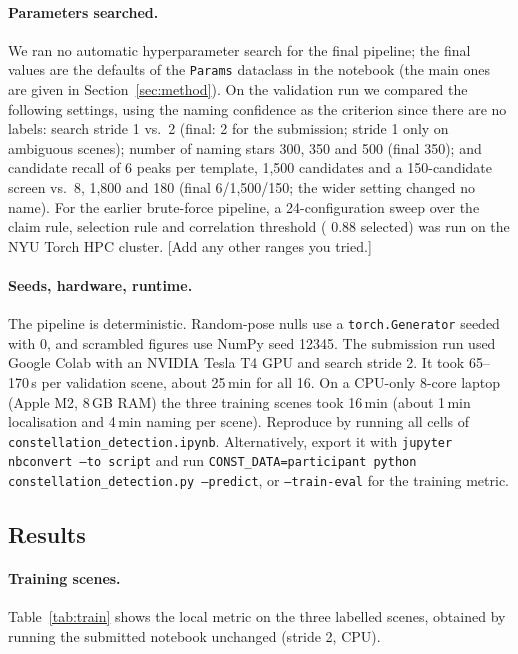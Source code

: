 \documentclass[a4paper,11pt]{article}
\newcommand{\fillin}[1]{{\color{red}[#1]}}
\begin{document}
\paragraph{Parameters searched.} We ran no automatic hyperparameter search for the final pipeline; the final
values are the defaults of the \texttt{Params} dataclass in the notebook (the main ones are given in
Section~\ref{sec:method}). On the validation run we compared the following settings, using the naming confidence as the criterion
since there are no labels: search stride 1 vs.\ 2 (final: 2 for the submission; stride 1 only on ambiguous scenes); number of
naming stars 300, 350 and 500 (final 350); and candidate recall of 6 peaks per template, 1,500 candidates and a
150-candidate screen vs.\ 8, 1,800 and 180 (final 6/1,500/150; the wider setting changed no name). For the earlier
brute-force pipeline, a 24-configuration sweep over the claim rule, selection rule and correlation threshold (
0.88 selected) was run on the NYU Torch HPC cluster. \fillin{Add any other ranges you tried.}

\paragraph{Seeds, hardware, runtime.} The pipeline is deterministic. Random-pose nulls use a \texttt{torch.Generator}
seeded with 0, and scrambled figures use NumPy seed 12345. The submission run used Google Colab with an NVIDIA Tesla
T4 GPU and search stride 2. It took 65--170\,s per validation scene, about 25\,min for all 16. On a CPU-only 8-core
laptop (Apple M2, 8\,GB RAM) the three training scenes took 16\,min (about 1\,min localisation and 4\,min naming per scene). Reproduce by running all cells of \texttt{constellation\_detection.ipynb}. Alternatively, export it with
\texttt{jupyter nbconvert --to script} and run \texttt{CONST\_DATA=participant python constellation\_detection.py
--predict}, or \texttt{--train-eval} for the training metric.

\subsection{Results}

\paragraph{Training scenes.} Table~\ref{tab:train} shows the local metric on the three labelled scenes, obtained by
running the submitted notebook unchanged (stride 2, CPU).
\end{document}
